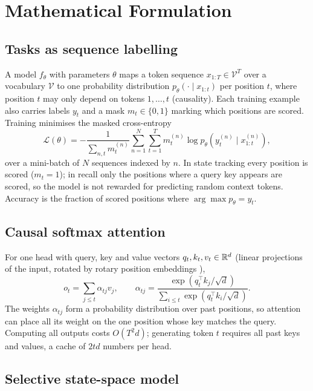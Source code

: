 \section{Mathematical Formulation}
\label{sec:math}

\subsection{Tasks as sequence labelling}
A model $f_\theta$ with parameters $\theta$ maps a token sequence $x_{1:T}\in\mathcal{V}^T$ over a vocabulary
$\mathcal{V}$ to one probability distribution $p_\theta(\cdot\mid x_{1:t})$ per position $t$, where position $t$
may only depend on tokens $1,\dots,t$ (causality). Each training example also carries labels $y_t$ and a mask
$m_t\in\{0,1\}$ marking which positions are scored. Training minimises the masked cross-entropy
\begin{equation}
  \mathcal{L}(\theta) = -\frac{1}{\sum_{n,t} m^{(n)}_t}\sum_{n=1}^{N}\sum_{t=1}^{T} m^{(n)}_t
  \log p_\theta\!\left(y^{(n)}_t \mid x^{(n)}_{1:t}\right),
  \label{eq:loss}
\end{equation}
over a mini-batch of $N$ sequences indexed by $n$. In state tracking every position is scored ($m_t=1$); in
recall only the positions where a query key appears are scored, so the model is not rewarded for predicting
random context tokens. Accuracy is the fraction of scored positions where $\arg\max p_\theta = y_t$.

\subsection{Causal softmax attention}
For one head with query, key and value vectors $q_t,k_t,v_t\in\mathbb{R}^d$ (linear projections of the input,
rotated by rotary position embeddings \citep{su2021roformer}),
\begin{equation}
  o_t = \sum_{j\le t} \alpha_{tj} v_j, \qquad
  \alpha_{tj} = \frac{\exp(q_t^\top k_j/\sqrt{d})}{\sum_{i\le t}\exp(q_t^\top k_i/\sqrt{d})} .
  \label{eq:attn}
\end{equation}
The weights $\alpha_{tj}$ form a probability distribution over past positions, so attention can place all
its weight on the one position whose key matches the query. Computing all outputs costs $O(T^2 d)$; generating
token $t$ requires all past keys and values, a cache of $2td$ numbers per head.

\subsection{Selective state-space model}
